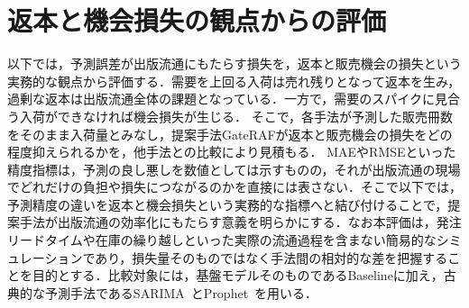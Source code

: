 \documentclass[twocolumn, lastpage]{jarticle}
\begin{document}
\section{返本と機会損失の観点からの評価}
以下では，予測誤差が出版流通にもたらす損失を，返本と販売機会の損失という実務的な観点から評価する．需要を上回る入荷は売れ残りとなって返本を生み，過剰な返本は出版流通全体の課題となっている．一方で，需要のスパイクに見合う入荷ができなければ機会損失が生じる．
そこで，各手法が予測した販売冊数をそのまま入荷量とみなし，提案手法GateRAFが返本と販売機会の損失をどの程度抑えられるかを，他手法との比較により見積もる．
MAEやRMSEといった精度指標は，予測の良し悪しを数値としては示すものの，それが出版流通の現場でどれだけの負担や損失につながるのかを直接には表さない．そこで以下では，予測精度の違いを返本と機会損失という実務的な指標へと結び付けることで，提案手法が出版流通の効率化にもたらす意義を明らかにする．なお本評価は，発注リードタイムや在庫の繰り越しといった実際の流通過程を含まない簡易的なシミュレーションであり，損失量そのものではなく手法間の相対的な差を把握することを目的とする．比較対象には，基盤モデルそのものであるBaselineに加え，古典的な予測手法であるSARIMA~\cite{Box.1970}とProphet~\cite{Taylor.2018}を用いる．
\end{document}
